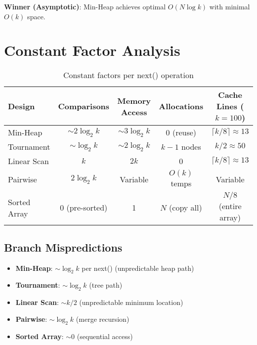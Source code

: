 \documentclass[11pt]{article}
\begin{document}
\textbf{Winner (Asymptotic)}: Min-Heap achieves optimal $O(N \log k)$ with minimal $O(k)$ space.

\section{Constant Factor Analysis}

\begin{table}[h]
\centering
\small
\begin{tabular}{@{}lcccc@{}}
\toprule
\textbf{Design}  & \textbf{Comparisons} & \textbf{Memory Access} & \textbf{Allocations} & \textbf{Cache Lines ($k=100$)} \\ \midrule
Min-Heap         & $\sim 2 \log_2 k$    & $\sim 3 \log_2 k$      & 0 (reuse)            & $\lceil k/8 \rceil \approx 13$  \\
Tournament       & $\sim \log_2 k$      & $\sim 2 \log_2 k$      & $k-1$ nodes          & $k/2 \approx 50$                \\
Linear Scan      & $k$                  & $2k$                   & 0                    & $\lceil k/8 \rceil \approx 13$  \\
Pairwise         & $2 \log_2 k$         & Variable               & $O(k)$ temps         & Variable                        \\
Sorted Array     & 0 (pre-sorted)       & 1                      & $N$ (copy all)       & $N/8$ (entire array)            \\ \bottomrule
\end{tabular}
\caption{Constant factors per next() operation}
\label{tab:constants}
\end{table}

\subsection{Branch Mispredictions}

\begin{itemize}
    \item \textbf{Min-Heap}: $\sim \log_2 k$ per next() (unpredictable heap path)
    \item \textbf{Tournament}: $\sim \log_2 k$ (tree path)
    \item \textbf{Linear Scan}: $\sim k/2$ (unpredictable minimum location)
    \item \textbf{Pairwise}: $\sim \log_2 k$ (merge recursion)
    \item \textbf{Sorted Array}: $\sim 0$ (sequential access)
\end{itemize}
\end{document}
